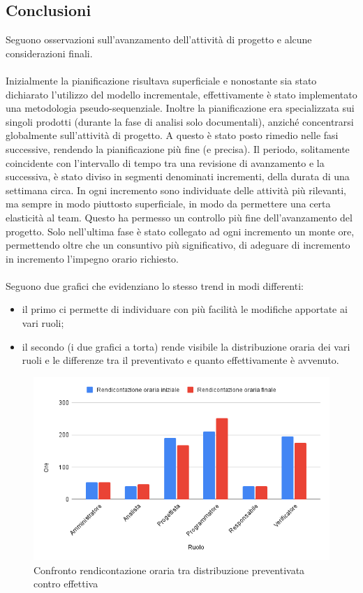 \subsection{Conclusioni}
        Seguono osservazioni sull'avanzamento dell'attività di progetto e alcune considerazioni finali.
        \\ \\ \noindent
        Inizialmente la pianificazione risultava superficiale e nonostante sia stato dichiarato l'utilizzo del modello incrementale, effettivamente è stato implementato una metodologia pseudo-sequenziale. Inoltre la pianificazione era specializzata sui singoli prodotti (durante la fase di analisi solo documentali), anziché concentrarsi globalmente sull'attività di progetto. A questo è stato posto rimedio nelle fasi successive, rendendo la pianificazione più fine (e precisa). Il periodo, solitamente coincidente con l'intervallo di tempo tra una revisione di avanzamento e la successiva, è stato diviso in segmenti denominati incrementi, della durata di una settimana circa. In ogni incremento sono individuate delle attività più rilevanti, ma sempre in modo piuttosto superficiale, in modo da permettere una certa elasticità al team. Questo ha permesso un controllo più fine dell'avanzamento del progetto. Solo nell'ultima fase è stato collegato ad ogni incremento un monte ore, permettendo oltre che un consuntivo più significativo, di adeguare di incremento in incremento l'impegno orario richiesto.
        \\ \\ \noindent
        Seguono due grafici che evidenziano lo stesso trend in modi differenti: 
        \begin{itemize}
            \item il primo ci permette di individuare con più facilità le modifiche apportate ai vari ruoli;
            \item il secondo (i due grafici a torta) rende visibile la distribuzione oraria dei vari ruoli e le differenze tra il preventivato e quanto effettivamente è avvenuto.
        \end{itemize}
        \begin{figure}[H]
            \centering
            \includegraphics[width=\textwidth]{source/img/confronto_rendicontazione.png}
            \caption{Confronto rendicontazione oraria tra distribuzione preventivata contro effettiva}
        \end{figure}
